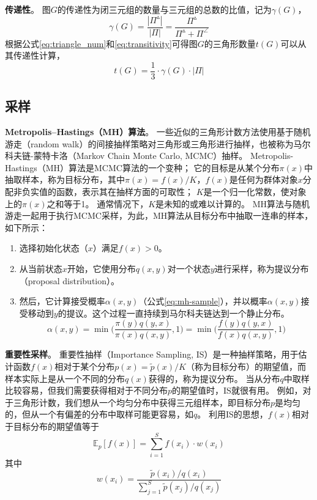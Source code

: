 \textbf{传递性}。
图$G$的传递性为闭三元组的数量与三元组的总数的比值，记为$\gamma(G)$，
\begin{equation}
    \gamma(G)=\frac{|\Pi^\vartriangle|}{|\Pi|}=\frac{\Pi^\vartriangle}{\Pi^\vartriangle+\Pi^\angle}
    \label{eq:transitivity}
\end{equation}
根据公式\ref{eq:triangle_num}和\ref{eq:transitivity}可得图$G$的三角形数量$t(G)$可以从其传递性计算，
\begin{equation}
    t(G)=\frac{1}{3}\cdot \gamma(G) \cdot |\Pi| 
    \label{eq:tc_trans}
\end{equation}

\subsection{采样}

\textbf{Metropolis–Hastings（MH）算法}。
一些近似的三角形计数方法使用基于随机游走（random walk）的间接抽样策略对三角形或三角形进行抽样，也被称为马尔科夫链-蒙特卡洛（Markov Chain Monte Carlo, MCMC）抽样。
Metropolis-Hastings（MH）算法是MCMC算法的一个变种；
它的目标是从某个分布$\pi(x)$中抽取样本，称为目标分布，其中$\pi(x)=f(x)/K$，$f(x)$是任何为群体对象$x$分配非负实值的函数，表示其在抽样方面的可取性；
$K$是一个归一化常数，使对象上的$\pi(x)$之和等于1。
通常情况下，$K$是未知的或难以计算的。
MH算法与随机游走一起用于执行MCMC采样，为此，MH算法从目标分布中抽取一连串的样本，如下所示：
\begin{enumerate}
    \item 选择初始化状态（$x$）满足$f(x)>0$。
    \item 从当前状态$x$开始，它使用分布$q(x, y)$对一个状态$y$进行采样，称为提议分布（proposal distribution）。
    \item 然后，它计算接受概率$\alpha (x,y)$（公式\ref{eq:mh-sample}），并以概率$\alpha (x,y)$接受移动到$y$的提议。这个过程一直持续到马尔科夫链达到一个静止分布。
    \begin{equation}
        \alpha (x,y)=\min\Bigg(\frac{\pi(y)q(y,x)}{\pi(x)q(x,y)},1 \Bigg)=\min\Bigg(\frac{f(y)q(y,x)}{f(x)q(x,y)},1 \Bigg)
        \label{eq:mh-sample}
    \end{equation}
\end{enumerate}

\textbf{重要性采样}。
重要性抽样（Importance Sampling, IS）是一种抽样策略，用于估计函数$f(x)$相对于某个分布$p(x)=\tilde{p}(x)/K$（称为目标分布）的期望值，而样本实际上是从一个不同的分布$q(x)$获得的，称为提议分布。
当从分布$q$中取样比较容易，但我们需要获得相对于不同分布$p$的期望值时，IS就很有用。
例如，对于三角形计数，我们想从一个均匀分布中获得三元组样本，即目标分布$p$是均匀的，但从一个有偏差的分布中取样可能更容易，如$q$。
利用IS的思想，$f(x)$相对于目标分布的期望值等于
\begin{equation}
    \mathbb{E}_{p}[f(x)]=\sum_{i=1}^{S} f\left(x_{i}\right) \cdot w\left(x_{i}\right)
    \label{eq:IS}
\end{equation}
其中
\begin{equation}
    w\left(x_{i}\right)=\frac{\widetilde{p}\left(x_{i}\right) / q\left(x_{i}\right)}{\sum_{j=1}^{S} \tilde{p}\left(x_{j}\right) / q\left(x_{j}\right)}
\end{equation}


